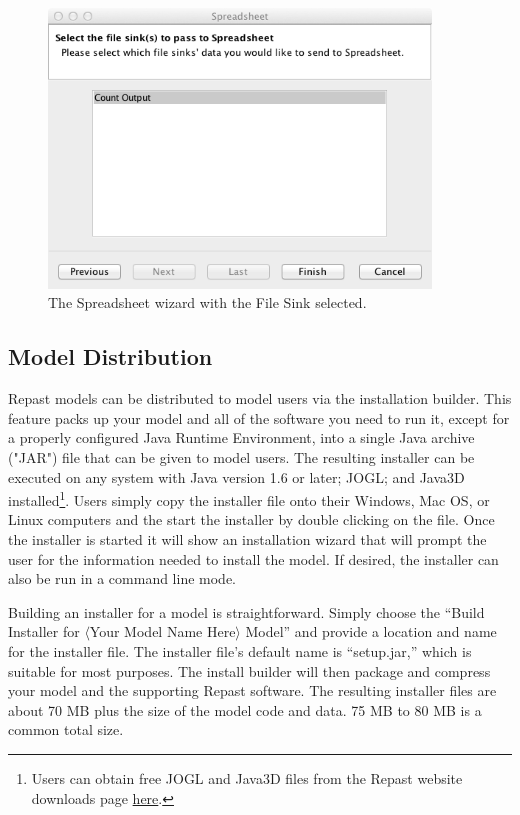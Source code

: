 \documentclass[11pt]{amsart}
\begin{document}
\begin{figure}
\begin{center}
\vspace{.2in}
\centerline {
\includegraphics[width=4in]{GettingStartedImages/Spreadsheet.png}
}
\caption{The Spreadsheet wizard with the File Sink selected.}
\label{fig:spreadsheet}
\end{center}
\end{figure}

\subsection{Model Distribution}

Repast models can be distributed to model users via the installation builder. This feature packs up your model and all of the software you need to run it, except for a properly configured Java Runtime Environment, into a single Java archive ("JAR") file that can be given to model users. The resulting installer can be executed on any system with Java version 1.6 or later; JOGL; and Java3D installed\footnote{Users can obtain free JOGL and Java3D files from the Repast website downloads page \href{http://repast.sourceforge.net/downloads.html}{here}.}. Users simply copy the installer file onto their Windows, Mac OS, or Linux computers and the start the installer by double clicking on the file. Once the installer is started it will show an installation wizard that will prompt the user for the information needed to install the model. If desired, the installer can also be run in a command line mode.

Building an installer for a model is straightforward. Simply choose the ``Build Installer for $\langle$Your Model Name Here$\rangle$ Model'' and provide a location and name for the installer file. The installer file's default name is ``setup.jar,'' which is suitable for most purposes. The install builder will then package and compress your model and the supporting Repast software. The resulting installer files are about 70 MB plus the size of the model code and data. 75 MB to 80 MB is a common total size.
\end{document}
